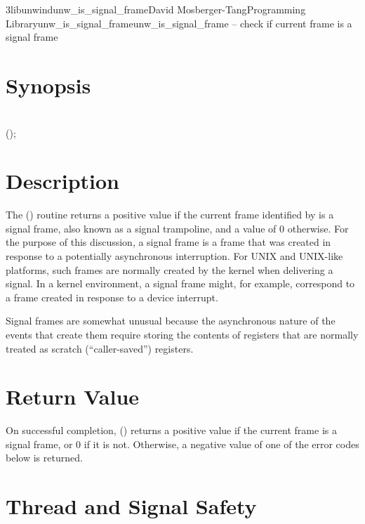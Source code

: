 \documentclass{article}
\begin{document}
\begin{Name}{3libunwind}{unw\_is\_signal\_frame}{David Mosberger-Tang}{Programming Library}{unw\_is\_signal\_frame}unw\_is\_signal\_frame -- check if current frame is a signal frame
\end{Name}

\section{Synopsis}

\\

 ();\\

\section{Description}

The () routine returns a positive value
if the current frame identified by  is a signal frame,
also known as a signal trampoline,
and a value of 0 otherwise.
For the purpose of this discussion,
a signal frame is a frame that was created in response to a potentially
asynchronous interruption.
For UNIX and UNIX-like platforms,
such frames are normally created by the kernel when delivering a signal.
In a kernel environment, a signal frame might, for example, correspond
to a frame created in response to a device interrupt.

Signal frames are somewhat unusual because the asynchronous nature of
the events that create them require storing the contents of registers
that are normally treated as scratch (``caller-saved'') registers.

\section{Return Value}

On successful completion, () returns a
positive value if the current frame is a signal frame, or 0 if it is
not.  Otherwise, a negative value of one of the error codes below is
returned.

\section{Thread and Signal Safety}
\end{document}
